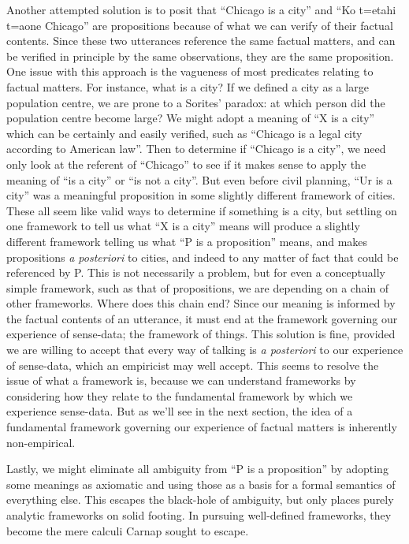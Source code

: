 \documentclass[12pt]{article}
\begin{document}
Another attempted solution is to posit that ``Chicago is a city'' and ``Ko t\a=etahi t\a=aone Chicago'' are propositions because of what we can verify of their factual contents. Since these two utterances reference the same factual matters, and can be verified in principle by the same observations, they are the same proposition. One issue with this approach is the vagueness of most predicates relating to factual matters. For instance, what is a city? If we defined a city as a large population centre, we are prone to a Sorites' paradox: at which person did the population centre become large? We might adopt a meaning of ``X is a city'' which can be certainly and easily verified, such as ``Chicago is a legal city according to American law''. Then to determine if ``Chicago is a city'', we need only look at the referent of ``Chicago'' to see if it makes sense to apply the meaning of ``is a city'' or ``is not a city''. But even before civil planning, ``Ur is a city'' was a meaningful proposition in some slightly different framework of cities. These all seem like valid ways to determine if something is a city, but settling on one framework to tell us what ``X is a city'' means will produce a slightly different framework telling us what ``P is a proposition'' means, and makes propositions \textit{a posteriori} to cities, and indeed to any matter of fact that could be referenced by P. This is not necessarily a problem, but for even a conceptually simple framework, such as that of propositions, we are depending on a chain of other frameworks. Where does this chain end? Since our meaning is informed by the factual contents of an utterance, it must end at the framework governing our experience of sense-data; the framework of things. This solution is fine, provided we are willing to accept that every way of talking is \textit{a posteriori} to our experience of sense-data, which an empiricist may well accept. This seems to resolve the issue of what a framework is, because we can understand frameworks by considering how they relate to the fundamental framework by which we experience sense-data. But as we'll see in the next section, the idea of a fundamental framework governing our experience of factual matters is inherently non-empirical.

Lastly, we might eliminate all ambiguity from ``P is a proposition'' by adopting some meanings as axiomatic and using those as a basis for a formal semantics of everything else. This escapes the black-hole of ambiguity, but only places purely analytic frameworks on solid footing. In pursuing well-defined frameworks, they become the mere calculi Carnap sought to escape.
\end{document}
